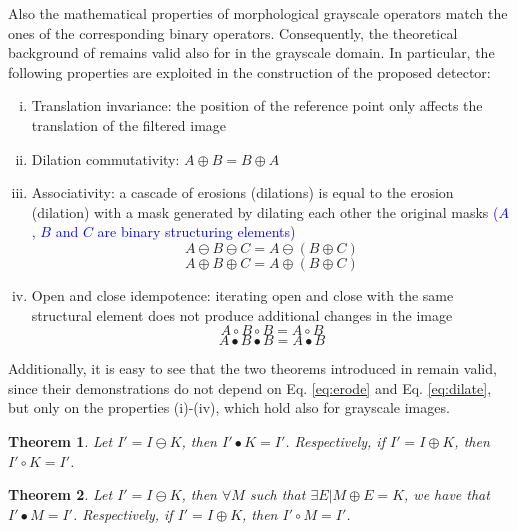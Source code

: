 \documentclass{ieeeaccess}
\newtheorem{theorem}{Theorem}
\newcommand{\revisedtext}[1]{\textcolor{blue}{#1}}
\begin{document}
Also the mathematical properties of morphological grayscale operators match the ones of the corresponding binary operators. Consequently, the theoretical background of \cite{de2017detecting} remains valid also for in the grayscale domain. In particular, the following properties are exploited in the construction of the proposed detector:

\begin{enumerate}[(i)]
	\item Translation invariance: the position of the reference point only affects the translation of the filtered image
	\item Dilation commutativity: $A\oplus B = B \oplus A$
	\item Associativity: a cascade of erosions (dilations) is equal to the erosion (dilation) with a mask generated by dilating each other the original masks \revisedtext{($A$, $B$ and $C$ are binary structuring elements)}
	\begin{equation}
	A \ominus B \ominus C = A \ominus (B \oplus C)
	\end{equation}
	\vspace{-0.5cm}
	\begin{equation}
	A \oplus B \oplus C = A \oplus (B \oplus C)
	\end{equation} 
	\item Open and close idempotence: iterating open and close with the same structural element does not produce additional changes in the image
	\begin{equation}
	A \circ B \circ B = A \circ B
	\end{equation}
	\vspace{-0.5cm}
	\begin{equation}
	A \bullet B \bullet B = A \bullet B
	\end{equation} 
\end{enumerate}

Additionally, it is easy to see that the two theorems introduced in \cite{de2017detecting} remain valid, since their demonstrations do not depend on Eq. \ref{eq:erode} and Eq. \ref{eq:dilate}, but only on the properties (i)-(iv), which hold also for grayscale images.

\begin{theorem}
	\label{theorem_1}
	Let $I' = I \ominus K$, then $I'\bullet K = I'$. Respectively, if $I' = I \oplus K$, then $I'\circ K = I'$.
\end{theorem}

\begin{theorem}
	\label{theorem_2}
	Let $I' = I \ominus K$, then $\forall M$ such that $\exists E | M \oplus E = K$, we have that $I' \bullet M = I'$. Respectively, if $I' = I \oplus K$, then $I' \circ M = I'$.
\end{theorem}
\end{document}
